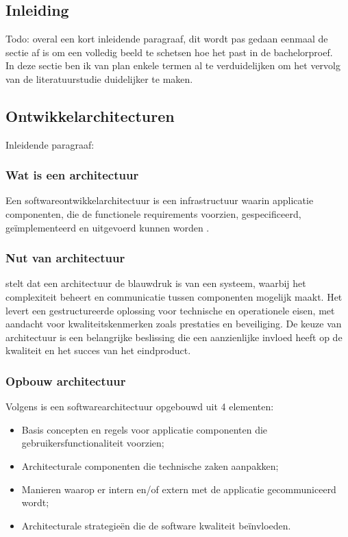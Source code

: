 \chapter{}%
\label{ch:stand-van-zaken}
\section{Inleiding}
Todo: overal een kort inleidende paragraaf, dit wordt pas gedaan eenmaal de sectie af is om een volledig beeld te schetsen hoe het past in de bachelorproef.\\
In deze sectie ben ik van plan enkele termen al te verduidelijken om het vervolg van de literatuurstudie duidelijker te maken.


\section{Ontwikkelarchitecturen}
Inleidende paragraaf:

\subsection{Wat is een architectuur}
Een softwareontwikkelarchitectuur is een infrastructuur waarin applicatie componenten, die de functionele requirements voorzien, gespecificeerd, geïmplementeerd en uitgevoerd kunnen worden \autocite{Solms2012}. 

\subsection{Nut van architectuur}
\textcite{Jaiswal2019} stelt dat een architectuur de blauwdruk is van een systeem, waarbij het complexiteit beheert en communicatie tussen componenten mogelijk maakt. Het levert een gestructureerde oplossing voor technische en operationele eisen, met aandacht voor kwaliteitskenmerken zoals prestaties en beveiliging. De keuze van architectuur is een belangrijke beslissing die een aanzienlijke invloed heeft op de kwaliteit en het succes van het eindproduct.


\subsection{Opbouw architectuur}
Volgens \textcite{Solms2012} is een softwarearchitectuur opgebouwd uit 4 elementen:
\begin{itemize}
    \item Basis concepten en regels voor applicatie componenten die gebruikersfunctionaliteit voorzien;
    \item Architecturale componenten die technische zaken aanpakken;
    \item Manieren waarop er intern en/of extern met de applicatie gecommuniceerd wordt;
    \item Architecturale strategieën die de software kwaliteit beïnvloeden.
\end{itemize}


